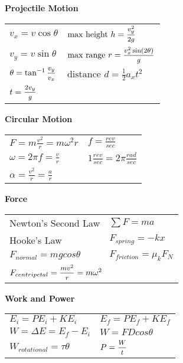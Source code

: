 \documentclass[12pt]{article}
\begin{document}
\begin{minipage}[t]{.5\textwidth}
\textbf{Projectile Motion} \\[6pt]
	\begin{tabular}{p{3cm} p{6cm}}
	$v_x = v \cos \theta$ & $\text{max height   } h = \mfrac{v_{y}^2}{2g}$ \\[6pt]
	$v_y = v \sin \theta$ & $\text{max range   } r = \mfrac{v_{x}^2 \sin(2\theta)}{g}$ \\[6pt]
		
	$\theta = \tan ^{-1} \mfrac{v_y}{v_x}$ & $\text{distance    } d = \tfrac{1}{2} a_x t^2$ \\[6pt]
	$t = \mfrac{2v_{y}}{g}$ & \\[6pt]
	\end{tabular}

\end{minipage}\vspace{12pt}

\begin{minipage}[t]{.5\textwidth}
\textbf{Circular Motion} \\[6pt]
\begin{tabular}{p{4cm} p{6cm}}
	$F=m \frac{v^2}{r}=m \omega^2 r$ & $f = \frac{rev}{sec}$ \\[6pt]
	$\omega = 2\pi f = \frac{v}{r}$ & $1 \frac{rev}{sec} = 2\pi \frac{rad}{sec}$ \\[6pt]
	$\alpha = \frac{v^2}{r} = \frac{a}{r}$ & \\[12pt]
\end{tabular}	
\end{minipage}

\begin{minipage}[t]{.5\textwidth}
\textbf{Force} \\[6pt]
\begin{tabular}{p{4cm} p{6cm}}
	\small{Newton's Second Law} & $\sum F = ma$ \\[6pt]
	\small{Hooke's Law} & $F_{spring} = -kx$ \\[6pt]
	$F_{normal} = mgcos\theta$ & $F_{friction} = \mu_k F_N$ \\[6pt]
	\multicolumn{2}{l}{	$F_{centripetal} = \mfrac{mv^2}{r} = m\omega^2$} \\[12pt]
\end{tabular}	
\end{minipage}

\begin{minipage}[t]{.5\textwidth}
\textbf{Work and Power} \\[6pt]
\begin{tabular}{p{4cm} p{6cm}}
	$E_i = PE_i + KE_i$ & $E_f = PE_f + KE_f$ \\[6pt]
	$W = \Delta E = E_f - E_i$ & $W = FDcos\theta$ \\[6pt]
	$W_{rotational} = \tau \theta$ & $P = \mfrac{W}{t}$ \\[6pt]
\end{tabular}	
\end{minipage}
\end{document}
